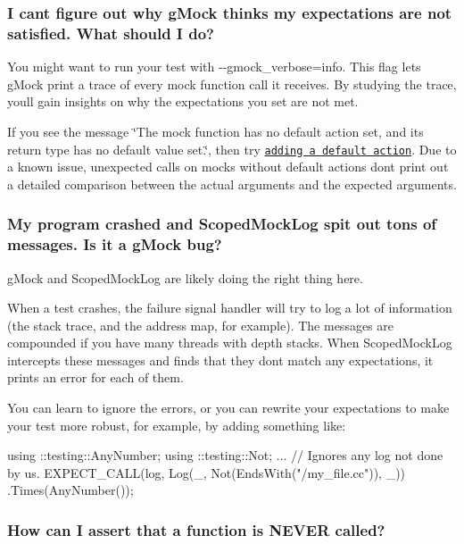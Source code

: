 \subsubsection*{I can\textquotesingle{}t figure out why g\+Mock thinks my expectations are not satisfied. What should I do?}

You might want to run your test with {\ttfamily -\/-\/gmock\+\_\+verbose=info}. This flag lets g\+Mock print a trace of every mock function call it receives. By studying the trace, you\textquotesingle{}ll gain insights on why the expectations you set are not met.

If you see the message \char`\"{}\+The mock function has no default action set, and its
return type has no default value set.\char`\"{}, then try \href{gmock_cheat_sheet.md#OnCall}{\tt adding a default action}. Due to a known issue, unexpected calls on mocks without default actions don\textquotesingle{}t print out a detailed comparison between the actual arguments and the expected arguments.

\subsubsection*{My program crashed and {\ttfamily Scoped\+Mock\+Log} spit out tons of messages. Is it a g\+Mock bug?}

g\+Mock and {\ttfamily Scoped\+Mock\+Log} are likely doing the right thing here.

When a test crashes, the failure signal handler will try to log a lot of information (the stack trace, and the address map, for example). The messages are compounded if you have many threads with depth stacks. When {\ttfamily Scoped\+Mock\+Log} intercepts these messages and finds that they don\textquotesingle{}t match any expectations, it prints an error for each of them.

You can learn to ignore the errors, or you can rewrite your expectations to make your test more robust, for example, by adding something like\+:


\begin{DoxyCode}
using ::testing::AnyNumber;
using ::testing::Not;
...
  \textcolor{comment}{// Ignores any log not done by us.}
  EXPECT\_CALL(log, Log(\_, Not(EndsWith(\textcolor{stringliteral}{"/my\_file.cc"})), \_))
      .Times(AnyNumber());
\end{DoxyCode}


\subsubsection*{How can I assert that a function is N\+E\+V\+ER called?}


